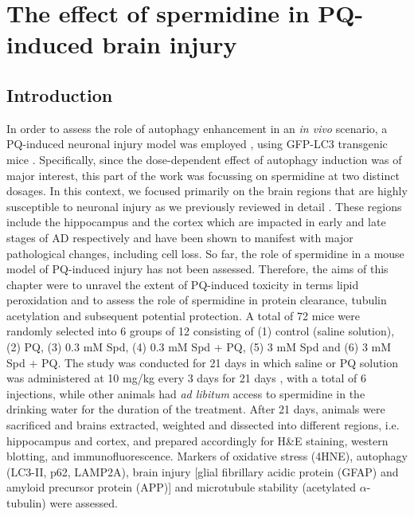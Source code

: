 \chapter{The effect of spermidine in PQ-induced brain injury}
\label{sec:chapter7}
\section{Introduction}
In order to assess the role of autophagy enhancement in an \textit{in vivo} scenario, a PQ-induced neuronal injury model was employed \citep{Chen2012}, using GFP-LC3 transgenic mice \citep{Mizushima2004a}. Specifically, since the dose-dependent effect of autophagy induction was of major interest, this part of the work was focussing on spermidine at two distinct dosages. In this context, we focused primarily on the brain regions that are highly susceptible to neuronal injury as we previously reviewed in detail \citep{lumkwana2017}. These regions include the hippocampus and the cortex which are impacted in early and late stages of AD respectively and have been shown to manifest with major pathological changes, including cell loss. So far, the role of spermidine in a mouse model of PQ-induced injury has not been assessed. Therefore, the aims of this chapter were to unravel the extent of PQ-induced toxicity in terms lipid peroxidation and to assess the role of spermidine in protein clearance, tubulin acetylation and subsequent potential protection. A total of 72 mice were randomly selected into 6 groups of 12 consisting of (1) control (saline solution), (2) PQ, (3) 0.3 mM Spd, (4) 0.3 mM Spd + PQ, (5) 3 mM Spd and (6) 3 mM Spd + PQ. The study was conducted for 21 days in which saline or PQ solution was administered at 10 mg/kg every 3 days for 21 days \citep{Chen2012}, with a total of 6 injections, while other animals had \textit{ad libitum} access to spermidine in the drinking water for the duration of the treatment. After 21 days, animals were sacrificed and brains extracted, weighted and dissected into different regions, i.e. hippocampus and cortex, and prepared accordingly for H\&E staining, western blotting, and immunofluorescence. Markers of oxidative stress (4HNE), autophagy (LC3-II, p62, LAMP2A), brain injury [glial fibrillary acidic protein (GFAP) and amyloid precursor protein (APP)] and microtubule stability (acetylated $\alpha$-tubulin) were assessed. 

